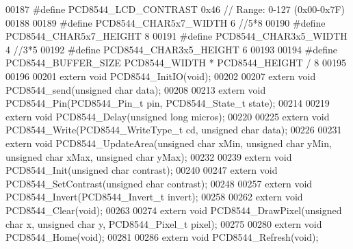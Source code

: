 \begin{DoxyCode}
00187 \textcolor{preprocessor}{#define PCD8544\_LCD\_CONTRAST        0x46    // Range: 0-127 (0x00-0x7F)}
00188 
00189 \textcolor{preprocessor}{#define PCD8544\_CHAR5x7\_WIDTH       6 //5*8}
00190 \textcolor{preprocessor}{#define PCD8544\_CHAR5x7\_HEIGHT      8}
00191 \textcolor{preprocessor}{#define PCD8544\_CHAR3x5\_WIDTH       4 //3*5}
00192 \textcolor{preprocessor}{#define PCD8544\_CHAR3x5\_HEIGHT      6}
00193 
00194 \textcolor{preprocessor}{#define PCD8544\_BUFFER\_SIZE         PCD8544\_WIDTH * PCD8544\_HEIGHT / 8}
00195 
00196 
00201 \textcolor{keyword}{extern} \textcolor{keywordtype}{void} PCD8544\_InitIO(\textcolor{keywordtype}{void});
00202 
00207 \textcolor{keyword}{extern} \textcolor{keywordtype}{void} PCD8544\_send(\textcolor{keywordtype}{unsigned} \textcolor{keywordtype}{char} data);
00208 
00213 \textcolor{keyword}{extern} \textcolor{keywordtype}{void} PCD8544\_Pin(PCD8544\_Pin\_t pin, PCD8544\_State\_t state);
00214 
00219 \textcolor{keyword}{extern} \textcolor{keywordtype}{void} PCD8544\_Delay(\textcolor{keywordtype}{unsigned} \textcolor{keywordtype}{long} micros);
00220 
00225 \textcolor{keyword}{extern} \textcolor{keywordtype}{void} PCD8544\_Write(PCD8544\_WriteType\_t cd, \textcolor{keywordtype}{unsigned} \textcolor{keywordtype}{char} data);
00226 
00231 \textcolor{keyword}{extern} \textcolor{keywordtype}{void} PCD8544\_UpdateArea(\textcolor{keywordtype}{unsigned} \textcolor{keywordtype}{char} xMin, \textcolor{keywordtype}{unsigned} \textcolor{keywordtype}{char} yMin, \textcolor{keywordtype}{unsigned} \textcolor{keywordtype}{char} xMax, \textcolor{keywordtype}{unsigned} \textcolor{keywordtype}{char} 
      yMax);
00232 
00239 \textcolor{keyword}{extern} \textcolor{keywordtype}{void} PCD8544\_Init(\textcolor{keywordtype}{unsigned} \textcolor{keywordtype}{char} contrast);
00240 
00247 \textcolor{keyword}{extern} \textcolor{keywordtype}{void} PCD8544\_SetContrast(\textcolor{keywordtype}{unsigned} \textcolor{keywordtype}{char} contrast);
00248 
00257 \textcolor{keyword}{extern} \textcolor{keywordtype}{void} PCD8544\_Invert(PCD8544\_Invert\_t invert);
00258 
00262 \textcolor{keyword}{extern} \textcolor{keywordtype}{void} PCD8544\_Clear(\textcolor{keywordtype}{void});
00263 
00274 \textcolor{keyword}{extern} \textcolor{keywordtype}{void} PCD8544\_DrawPixel(\textcolor{keywordtype}{unsigned} \textcolor{keywordtype}{char} x, \textcolor{keywordtype}{unsigned} \textcolor{keywordtype}{char} y, PCD8544\_Pixel\_t pixel);
00275 
00280 \textcolor{keyword}{extern} \textcolor{keywordtype}{void} PCD8544\_Home(\textcolor{keywordtype}{void});
00281 
00286 \textcolor{keyword}{extern} \textcolor{keywordtype}{void} PCD8544\_Refresh(\textcolor{keywordtype}{void});

\end{DoxyCode}
